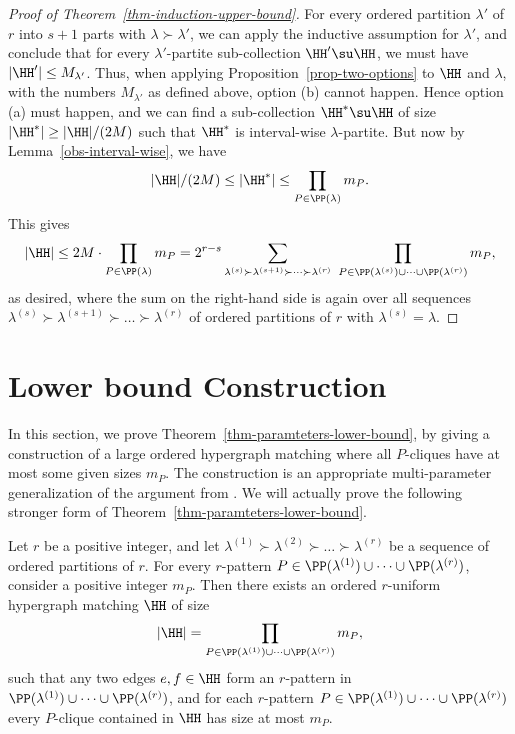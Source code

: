 \begin{proof}[Proof of Theorem~\ref{thm-induction-upper-bound}]
    For every ordered partition $\lambda'$ of $r$ into $s+1$ parts with $\lambda\succ\lambda'$, we can apply the inductive assumption for $\lambda'$, and conclude that for every $\lambda'$-partite sub-collection $\HH'\su \HH$, we must have $|\HH'|\le M_{\lambda'}$. Thus, when applying Proposition~\ref{prop-two-options} to $\HH$ and $\lambda$, with the numbers $M_{\lambda'}$ as defined above, option (b) cannot happen. Hence option (a) must happen, and we can find a sub-collection $\HH^*\su \HH$ of size $|\HH^*|\ge |\HH|/(2M)$ such that $\HH^*$ is interval-wise $\lambda$-partite. But now by Lemma~\ref{obs-interval-wise}, we have
    \[|\HH|/(2M)\le |\HH^*|\le \prod_{P\in \PP(\lambda)} m_{P}.\]
    This gives
    \[|\HH|\le 2M\cdot \prod_{P\in \PP(\lambda)} m_{P}=2^{r-s} \sum_{\lambda^{(s)} \succ \lambda^{(s+1)} \succ \dots \succ \lambda^{(r)}}\ \prod_{ P\in \PP(\lambda^{(s)})\cup\dots\cup \PP(\lambda^{(r)}) } m_{P},\]
    as desired, where the sum on the right-hand side is again over all sequences $\lambda^{(s)} \succ \lambda^{(s+1)} \succ \dots \succ \lambda^{(r)}$ of ordered partitions of $r$ with $\lambda^{(s)}=\lambda$.
    \end{proof}


\section{Lower bound Construction}
\label{sect-lower-bound}



In this section, we prove Theorem~\ref{thm-paramteters-lower-bound}, by giving a construction of a large ordered hypergraph matching where all $P$-cliques have at most some given sizes $m_P$. The construction is an appropriate multi-parameter generalization of the argument from \cite[Section 4]{AJKS}. We will actually prove the following stronger form of Theorem~\ref{thm-paramteters-lower-bound}.

\begin{theorem} \label{thm-paramteters-lower-bound-stronger}
Let $r$ be a positive integer, and let $\lambda^{(1)} \succ \lambda^{(2)} \succ \dots \succ \lambda^{(r)}$ be a sequence of ordered partitions of $r$. For every $r$-pattern $P\in \PP(\lambda^{(1)})\cup\dots\cup \PP(\lambda^{(r)})$, consider a positive integer $m_P$. Then there exists an  ordered $r$-uniform hypergraph matching $\HH$ of size
\[|\HH|=\prod_{P\in \PP(\lambda^{(1)})\cup\dots\cup \PP(\lambda^{(r)})} m_{P},\]
such that any two edges $e,f\in \HH$ form an $r$-pattern in $\PP(\lambda^{(1)})\cup\dots\cup \PP(\lambda^{(r)})$, and for each $r$-pattern $P\in \PP(\lambda^{(1)})\cup\dots\cup \PP(\lambda^{(r)})$ every $P$-clique contained in $\HH$ has size at most $m_P$.
\end{theorem}

